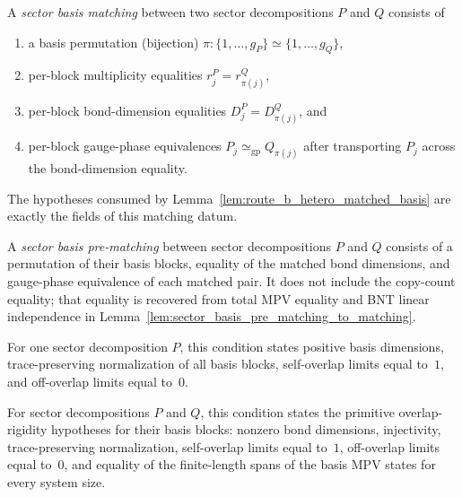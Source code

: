 \begin{definition}%
\label{def:sector_basis_matching}
	\leanok
	A \emph{sector basis matching} between two sector decompositions $P$ and $Q$
	consists of
	\begin{enumerate}
		\item a basis permutation (bijection)
		      $\pi : \{1,\dots,g_P\} \simeq \{1,\dots,g_Q\}$,
		\item per-block multiplicity equalities $r_j^P = r_{\pi(j)}^Q$,
		\item per-block bond-dimension equalities $D_j^P = D_{\pi(j)}^Q$, and
		\item per-block gauge-phase equivalences $P_j \simeq_{\mathrm{gp}} Q_{\pi(j)}$
		      after transporting $P_j$ across the bond-dimension equality.
	\end{enumerate}
	The hypotheses consumed by
	Lemma~\ref{lem:route_b_hetero_matched_basis} are exactly the fields of
	this matching datum.
\end{definition}

\begin{definition}%
\label{def:sector_basis_pre_matching}
	\leanok
	A \emph{sector basis pre-matching} between sector decompositions $P$
	and $Q$ consists of a permutation of their basis blocks, equality of the
	matched bond dimensions, and gauge-phase equivalence of each matched pair.
	It does not include the copy-count equality; that equality is recovered
	from total MPV equality and BNT linear independence in
	Lemma~\ref{lem:sector_basis_pre_matching_to_matching}.
\end{definition}

\begin{definition}%
\label{def:sector_basis_overlap_ortho_hyps}
	\leanok
	For one sector decomposition $P$, this condition states positive basis
	dimensions, trace-preserving normalization of all basis blocks,
	self-overlap limits equal to~$1$, and off-overlap limits equal to~$0$.
\end{definition}

\begin{definition}%
\label{def:sector_basis_overlap_span_hyps}
	\leanok
	For sector decompositions $P$ and $Q$, this condition states the
	primitive overlap-rigidity hypotheses for their basis blocks: nonzero
	bond dimensions, injectivity, trace-preserving normalization,
	self-overlap limits equal to~$1$, off-overlap limits equal to~$0$, and
	equality of the finite-length spans of the basis MPV states for every
	system size.
\end{definition}

